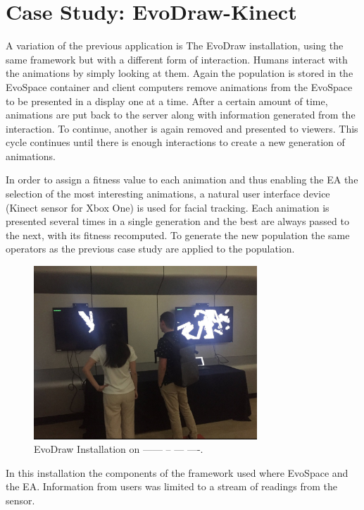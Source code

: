 \section{Case Study: EvoDraw-Kinect}
\label{sec:kinect}
A variation of the previous application is The EvoDraw installation, using the same
framework but with a different form of interaction. Humans interact with the animations 
by simply looking at them. Again the population is stored in the EvoSpace container and
client computers remove animations from the EvoSpace to be presented in a display one at a time. 
After a certain amount of time,  animations are put back to the server along with information 
generated from the interaction. To continue, another is again removed and presented to viewers. 
This cycle continues until there is enough interactions to create a new generation of animations. 

In order to assign a fitness value to each animation and thus enabling 
the EA the selection of the most interesting animations, a natural user interface 
device (Kinect sensor for Xbox One) is used for facial tracking. Each animation is 
presented several times in a single generation and the best are always passed to the next, 
with its fitness recomputed. To generate the new population the same operators as the previous case study
are applied to the population. 

\begin{figure}[!t]
    \centering
        \includegraphics[width=3.3in]{img/kinect.png}
    \caption{EvoDraw Installation on ------ -- --- ----.}
    \label{fig:kinect}
\end{figure}

In this installation the components of the framework used where EvoSpace and the EA.
Information from users was limited to a stream of readings from the
sensor.

